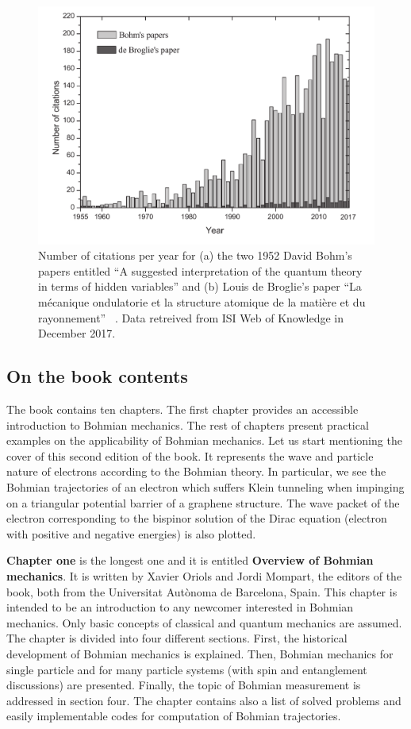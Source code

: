 \documentclass[nofootinbib, secnumarabic, amsmath, nobibnotes,10pt,aps,pra]{revtex4-1}
\begin{document}
\begin{figure}
\centering
\includegraphics*[width=13cm]{F0_citations.pdf}
\caption{Number of citations per year for (a) the two 1952 David Bohm's papers entitled ``A suggested interpretation of the quantum theory in terms of hidden variables'' \cite{om.bohm1952a,om.bohm1952b} and (b) Louis de Broglie's paper ``La m\'ecanique ondulatorie et la structure atomique de la mati\`ere et du rayonnement'' ~\cite{om.debroglie1927b}. Data retreived from ISI Web of Knowledge \cite{om.isiweb} in December 2017.}
\nonumber
\label{om_Datos_Bohm}
\end{figure}

\subsection{On the book contents}

The book contains ten chapters. The first chapter provides an accessible introduction to Bohmian mechanics. The rest of chapters present practical examples on the applicability of Bohmian mechanics. Let us start mentioning the cover of this second edition of the book. It represents the wave and particle nature of electrons according to the Bohmian theory. In particular, we see the Bohmian trajectories of an electron which suffers Klein tunneling when impinging on a triangular potential barrier of a graphene structure. The wave packet of the electron corresponding to the bispinor solution of the Dirac equation (electron with positive and negative energies) is also plotted. 

\textbf{Chapter one} is the longest one and it is entitled \textbf{Overview of Bohmian mechanics}. It is written by Xavier Oriols and Jordi Mompart, the editors of the book, both from the Universitat Aut\`{o}noma de Barcelona, Spain. This chapter is intended to be an introduction to any newcomer interested in Bohmian mechanics.  Only basic concepts of classical and quantum mechanics are assumed. The chapter is divided into four different sections. First, the historical development of Bohmian mechanics is explained. Then, Bohmian mechanics for single particle and for many particle systems (with spin and entanglement discussions) are presented. Finally, the topic of Bohmian measurement is addressed in section four. The chapter contains also a list of solved problems and easily implementable codes for computation of Bohmian trajectories.
\end{document}
